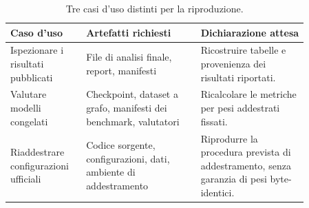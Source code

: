 \begin{table}[H]
\centering
\small
\caption{Tre casi d'uso distinti per la riproduzione.}
\label{tab:reproducibility-workflows}
\begin{tabular}{p{0.20\linewidth}p{0.34\linewidth}p{0.32\linewidth}}
\toprule
Caso d'uso & Artefatti richiesti & Dichiarazione attesa \\
\midrule
Ispezionare i risultati pubblicati & File di analisi finale, report, manifesti & Ricostruire tabelle e provenienza dei risultati riportati. \\
Valutare modelli congelati & Checkpoint, dataset a grafo, manifesti dei benchmark, valutatori & Ricalcolare le metriche per pesi addestrati fissati. \\
Riaddestrare configurazioni ufficiali & Codice sorgente, configurazioni, dati, ambiente di addestramento & Riprodurre la procedura prevista di addestramento, senza garanzia di pesi byte-identici. \\
\bottomrule
\end{tabular}
\end{table}
